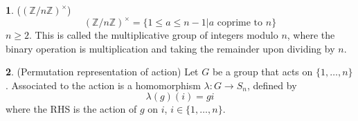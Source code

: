 \documentclass[12pt]{article}
\theoremstyle{definition}
\newtheorem{definition}{\color{NavyBlue}{\textbf{Definition}}}
\begin{document}
\begin{definition}($(\mathbb{Z}/n \mathbb{Z})^{\times}$)
\begin{equation}
(\mathbb{Z}/n \mathbb{Z})^{\times} = \{1 \leq a \leq n - 1 | a \text{ coprime to } n\}
\end{equation}
$n \geq 2$. This is called the multiplicative group of integers modulo $n$, where the binary operation is multiplication and taking the remainder upon dividing by $n$.
\end{definition}

\begin{definition}(Permutation representation of action)
Let $G$ be a group that acts on $\{1,\ldots, n\}$. Associated to the action is a homomorphism $\lambda : G \to S_n$, defined by
\begin{equation}
\lambda(g)(i) = gi
\end{equation}
where the RHS is the action of $g$ on $i$, $i \in \{1,\ldots, n\}$.
\end{definition}
\end{document}
